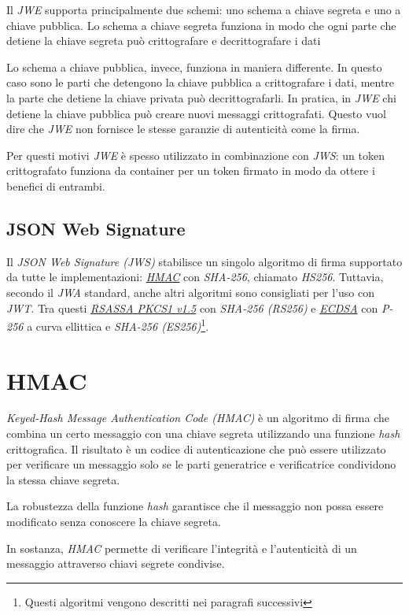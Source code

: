 Il \emph{JWE} supporta principalmente due schemi: uno schema a chiave segreta e uno a chiave pubblica.
Lo schema a chiave segreta funziona in modo che ogni parte che detiene la chiave segreta può crittografare e decrittografare i dati

Lo schema a chiave pubblica, invece, funziona in maniera differente.
In questo caso sono le parti che detengono la chiave pubblica a crittografare i dati, mentre la parte che detiene la chiave privata può decrittografarli.
In pratica, in \emph{JWE} chi detiene la chiave pubblica può creare nuovi messaggi crittografati.
Questo vuol dire che \emph{JWE} non fornisce le stesse garanzie di autenticità come la firma.

Per questi motivi \emph{JWE} è spesso utilizzato in combinazione con \emph{\gls{JWS}}: un token crittografato funziona da container per un token firmato in modo da ottere i benefici di entrambi.

\subsection{JSON Web Signature}
Il \emph{JSON Web Signature (JWS)} stabilisce un singolo algoritmo di firma supportato da tutte le implementazioni: \emph{\hyperref[cap:hmac]{HMAC}} con \emph{SHA-256}, chiamato \emph{HS256}.
Tuttavia, secondo il \emph{\gls{JWA}} standard, anche altri algoritmi sono consigliati per l'uso con \emph{JWT}.
Tra questi \emph{\hyperref[cap:rsassa]{RSASSA PKCS1 v1.5}} con \emph{SHA-256 (RS256)} e \emph{\hyperref[cap:ecdsa]{ECDSA}} con \emph{P-256} a curva ellittica e \emph{SHA-256 (ES256)}\footnote{Questi algoritmi vengono descritti nei paragrafi successivi}.


\section{HMAC}
\label{cap:hmac}

\emph{Keyed-Hash Message Authentication Code (HMAC)} è un algoritmo di firma che combina un certo messaggio con una chiave segreta utilizzando una funzione \emph{hash} crittografica.
Il risultato è un codice di autenticazione che può essere utilizzato per verificare un messaggio solo se le parti generatrice e verificatrice condividono la stessa chiave segreta.

La robustezza della funzione \emph{hash} garantisce che il messaggio non possa essere modificato senza conoscere la chiave segreta.

In sostanza, \emph{HMAC} permette di verificare l'integrità e l'autenticità di un messaggio attraverso chiavi segrete condivise.

